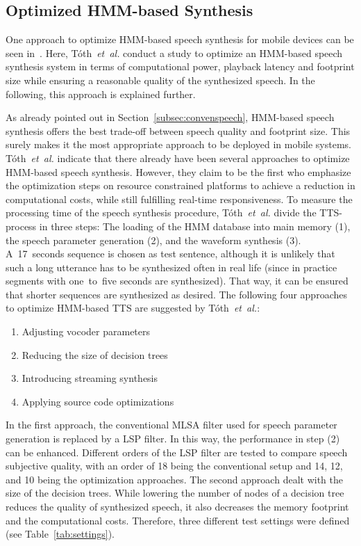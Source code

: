 \subsection{Optimized \ac{HMM}-based Synthesis}
\label{subsec:hmmembedded}

One approach to optimize \ac{HMM}-based speech synthesis for mobile devices can be seen in~\cite{toth:optimizing}. Here, T\'oth~\textit{et~al.} conduct a study to optimize an \ac{HMM}-based speech synthesis system in terms of computational power, playback latency and footprint size while ensuring a reasonable quality of the synthesized speech. In the following, this approach is explained further.

As already pointed out in Section~\ref{subsec:convenspeech}, \ac{HMM}-based speech synthesis offers the best trade-off between speech quality and footprint size. This surely makes it the most appropriate approach to be deployed in mobile systems. T\'oth~\textit{et~al.} indicate that there already have been several approaches to optimize \ac{HMM}-based speech synthesis. However, they claim to be the first who emphasize the optimization steps on resource constrained platforms to achieve a reduction in computational costs, while still fulfilling real-time responsiveness. To measure the processing time of the speech synthesis procedure, T\'oth~\textit{et~al.} divide the \ac{TTS}-process in three steps: The loading of the \ac{HMM} database into main memory (1), the speech parameter generation (2), and the waveform synthesis (3). A~17~seconds sequence is chosen as test sentence, although it is unlikely that such a long utterance has to be synthesized often in real life (since in practice segments with one~to~five seconds are synthesized). That way, it can be ensured that shorter sequences are synthesized as desired. The following four approaches to optimize \ac{HMM}-based \ac{TTS} are suggested by T\'oth~\textit{et~al.}:

\begin{enumerate}[label=\Alph*)]		%
	\parskip0.25em
	\bfseries
	\item Adjusting vocoder parameters
	\item Reducing the size of decision trees
	\item Introducing streaming synthesis
	\item Applying source code optimizations
\end{enumerate}

\noindent In the first approach, the conventional \ac{MLSA} filter used for speech parameter generation is replaced by a \ac{LSP} filter. In this way, the performance in step (2) can be enhanced. Different orders of the \ac{LSP} filter are tested to compare speech subjective quality, with an order of 18 being the conventional setup and 14, 12, and 10 being the optimization approaches. The second approach dealt with the size of the decision trees. While lowering the number of nodes of a decision tree reduces the quality of synthesized speech, it also decreases the memory footprint and the computational costs. Therefore, three different test settings were defined (see Table~\ref{tab:settings}).


